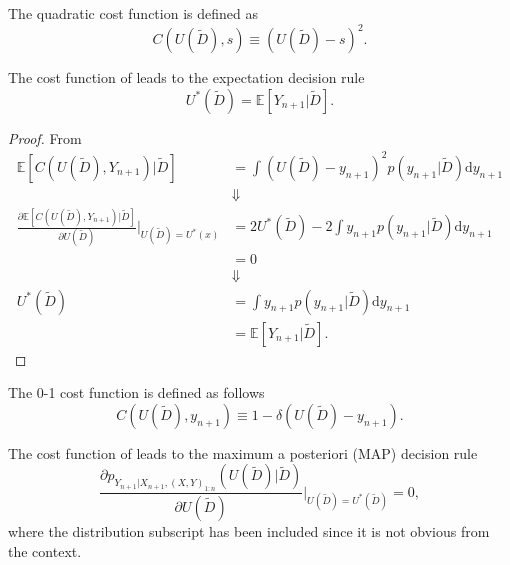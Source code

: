 \begin{definition}
	\label{def:quadratic_cost}
	The quadratic cost function is defined as
	\begin{equation}
		C(U(\tilde{D}),s) \equiv (U(\tilde{D})-s)^2.
	\end{equation}
\end{definition}

\begin{theorem}
	\label{theorem:expectation_decision_rule}
	The cost function of  leads to the expectation decision rule
	\begin{equation}
		U^*(\tilde{D}) = \mathbb{E}[Y_{n+1}|\tilde{D}].
	\end{equation}
\end{theorem}

\begin{proof}
	From 
	\begin{equation}
		\begin{split}
			\mathbb{E}[C(U(\tilde{D}), Y_{n+1})|\tilde{D}] &= \int (U(\tilde{D})-y_{n+1})^2 p(y_{n+1}|\tilde{D}) \mathrm{d}y_{n+1}\\
			&\Downarrow\\
			\frac{\partial \mathbb{E}[C(U(\tilde{D}), Y_{n+1})|\tilde{D}]}{\partial U(\tilde{D})}\bigg|_{U(\tilde{D})=U^*(x)} &= 2U^*(\tilde{D})-2\int y_{n+1}p(y_{n+1}|\tilde{D}) \mathrm{d}y_{n+1}\\
			&=0\\
			&\Downarrow\\
			U^*(\tilde{D})& = \int y_{n+1}p(y_{n+1}|\tilde{D})\mathrm{d}y_{n+1}\\
			&= \mathbb{E}[Y_{n+1}|\tilde{D}].
		\end{split}
	\end{equation}
\end{proof}

\begin{definition}
	\label{def:0_1_cost_function}
	The 0-1 cost function is defined as follows
	\begin{equation}
		C(U(\tilde{D}),y_{n+1}) \equiv 1-\delta(U(\tilde{D})-y_{n+1}).
	\end{equation}
\end{definition}

\begin{theorem}
	\label{theorem:MAP}
	The cost function of  leads to the maximum a posteriori (MAP) decision rule
	\begin{equation}
		\frac{\partial p_{Y_{n+1}|X_{n+1},(X,Y)_{1\colon n}}(U(\tilde{D})|\tilde{D})}{\partial U(\tilde{D})}\bigg|_{U(\tilde{D})=U^*(\tilde{D})}=0,
	\end{equation}
	where the distribution subscript has been included since it is not obvious from the context.
\end{theorem}

